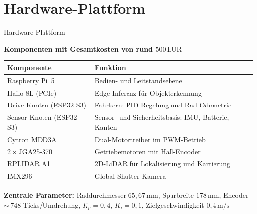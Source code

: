 \documentclass[aspectratio=169]{beamer}
\begin{document}
\section{Hardware-Plattform}

\begin{frame}{Hardware-Plattform}

  \textbf{Komponenten mit Gesamtkosten von rund $500\,\mathrm{EUR}$}

  \vspace{0.3em}
  {\small
  \begin{tabular}{@{}ll@{}}
    \toprule
    \textbf{Komponente} & \textbf{Funktion} \\
    \midrule
    Raspberry Pi~5           & Bedien- und Leitstandsebene \\
    Hailo-8L (PCIe)          & Edge-Inferenz für Objekterkennung \\
    Drive-Knoten (ESP32-S3)  & Fahrkern: PID-Regelung und Rad-Odometrie \\
    Sensor-Knoten (ESP32-S3) & Sensor- und Sicherheitsbasis: IMU, Batterie, Kanten \\
    Cytron MDD3A             & Dual-Motortreiber im PWM-Betrieb \\
    2\,$\times$\,JGA25-370   & Getriebemotoren mit Hall-Encoder \\
    RPLIDAR A1               & 2D-LiDAR für Lokalisierung und Kartierung \\
    IMX296                   & Global-Shutter-Kamera \\
    \bottomrule
  \end{tabular}}

  \vspace{0.5em}
  \textbf{Zentrale Parameter:}
  Raddurchmesser $65{,}67\,\mathrm{mm}$,\;
  Spurbreite $178\,\mathrm{mm}$,\;
  Encoder ${\sim}\,748$ Ticks/Umdrehung,\;
  $K_p = 0{,}4$,\; $K_i = 0{,}1$,\;
  Zielgeschwindigkeit $0{,}4\,\mathrm{m/s}$

\end{frame}

\end{document}

